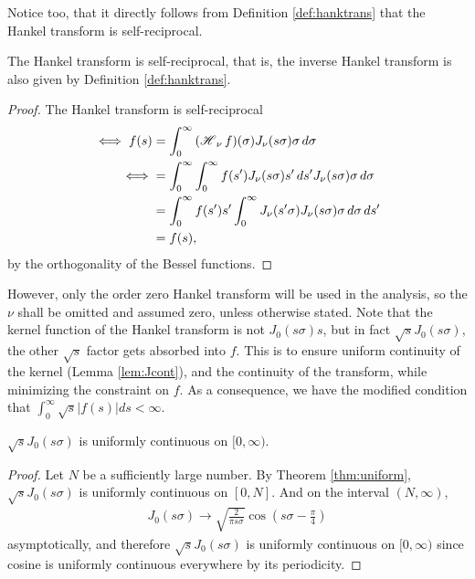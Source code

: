 Notice too, that it directly follows from Definition \ref{def:hanktrans} that the Hankel transform is self-reciprocal.

\begin{corollary}
\label{def:invhanktrans}
The Hankel transform is self-reciprocal, that is, the inverse Hankel transform is also given by Definition \ref{def:hanktrans}.
\end{corollary}
\begin{proof}
The Hankel transform is self-reciprocal
\begin{align*}
\iff f(s) &= \int_0^\infty \Hank[\nu]{f}(\sigma) J_\nu(s \sigma) \sigma \, d\sigma \\
\iff &= \int_0^\infty \int_0^\infty f(s') J_\nu(s \sigma) s' \, ds' J_\nu(s \sigma) \sigma \, d\sigma \\
&= \int_0^\infty f(s') s' \int_0^\infty J_\nu(s' \sigma) J_\nu(s \sigma) \sigma \, d\sigma \, ds' \\
&= f(s),
\end{align*}
by the orthogonality of the Bessel functions.
\end{proof}

However, only the order zero Hankel transform will be used in the analysis, so the $\nu$ shall be omitted and assumed zero, unless otherwise stated. Note that the kernel function of the Hankel transform is not $J_0 (s \sigma) s$, but in fact $\sqrt{s} J_0 (s \sigma)$, the other $\sqrt{s}$ factor gets absorbed into $f$. This is to ensure uniform continuity of the kernel (Lemma \ref{lem:Jcont}), and the continuity of the transform, while minimizing the constraint on $f$. As a consequence, we have the modified condition that $\int_0^\infty \sqrt{s}|f(s)| ds < \infty$.

\begin{lemma}
$\sqrt{s}J_0(s \sigma)$ is uniformly continuous on $[0,\infty)$.
\label{lem:Jcont}
\end{lemma}
\begin{proof}
Let $N$ be a sufficiently large number. By Theorem \ref{thm:uniform}, $\sqrt{s}J_0(s \sigma)$ is uniformly continuous on $[0,N]$. And on the interval $(N,\infty)$,
\begin{align*}
J_0(s \sigma) \rightarrow \sqrt{\frac{2}{\pi s \sigma}} \cos \left( s \sigma - \frac{\pi}{4} \right)
\end{align*}
asymptotically, and therefore $\sqrt{s}J_0(s \sigma)$ is uniformly continuous on $[0,\infty)$ since cosine is uniformly continuous everywhere by its periodicity.
\end{proof}

